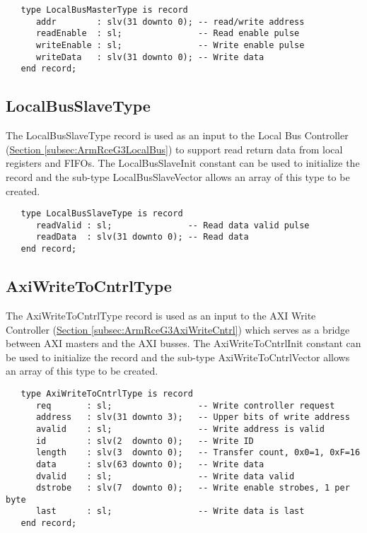 \documentclass[11pt]{article}
\begin{document}
\small
\begin{verbatim}
   type LocalBusMasterType is record
      addr        : slv(31 downto 0); -- read/write address
      readEnable  : sl;               -- Read enable pulse
      writeEnable : sl;               -- Write enable pulse
      writeData   : slv(31 downto 0); -- Write data
   end record;
\end{verbatim}
\normalsize

\subsection{LocalBusSlaveType}
\label{subsec:LocalBusSlaveType}

The LocalBusSlaveType record is used as an input to the Local Bus Controller (\hyperref[subsec:ArmRceG3LocalBus]{Section \ref*{subsec:ArmRceG3LocalBus}}) to support read return data from local registers and FIFOs.
The LocalBusSlaveInit constant can be used to initialize the record and the sub-type LocalBusSlaveVector allows an array of this type to be created.

\small
\begin{verbatim}
   type LocalBusSlaveType is record
      readValid : sl;               -- Read data valid pulse
      readData  : slv(31 downto 0); -- Read data
   end record;
\end{verbatim}
\normalsize

\subsection{AxiWriteToCntrlType}
\label{subsec:AxiWriteToCntrlType}

The AxiWriteToCntrlType record is used as an input to the AXI Write Controller (\hyperref[subsec:ArmRceG3AxiWriteCntrl]{Section \ref*{subsec:ArmRceG3AxiWriteCntrl}}) which serves as a bridge between AXI masters and the AXI busses.
The AxiWriteToCntrlInit constant can be used to initialize the record and the sub-type AxiWriteToCntrlVector allows an array of this type to be created.

\small
\begin{verbatim}
   type AxiWriteToCntrlType is record
      req       : sl;                 -- Write controller request
      address   : slv(31 downto 3);   -- Upper bits of write address
      avalid    : sl;                 -- Write address is valid
      id        : slv(2  downto 0);   -- Write ID
      length    : slv(3  downto 0);   -- Transfer count, 0x0=1, 0xF=16
      data      : slv(63 downto 0);   -- Write data
      dvalid    : sl;                 -- Write data valid
      dstrobe   : slv(7  downto 0);   -- Write enable strobes, 1 per byte
      last      : sl;                 -- Write data is last
   end record;
\end{verbatim}
\normalsize
\end{document}
